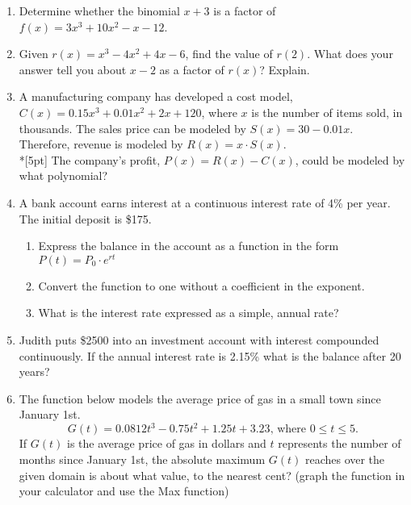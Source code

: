 \documentclass[12pt, oneside]{article}
\begin{document}
\begin{enumerate}

\item Determine whether the binomial $x+3$ is a factor of $f(x)=3x^3+10x^2-x-12$.

\item Given $r(x)=x^3-4x^2+4x-6$, find the value of $r(2)$.
What does your answer tell you about $x-2$ as a factor of $r(x)$? Explain. %

\item A manufacturing company has developed a cost model, $C(x)=0.15x^3+0.01x^2+2x+120$, where $x$ is the number of items sold, in thousands. The sales price can be modeled by $S(x)=30-0.01x$. Therefore, revenue is modeled by $R(x)=x \cdot S(x)$.\\*[5pt]
The company’s profit, $P(x)=R(x)-C(x)$, could be modeled by what polynomial?  %

\newpage

\item A bank account earns interest at a continuous interest rate of 4\% per year. The initial deposit is \$175.
\begin{enumerate}
    \item Express the balance in the account as a function in the form $P(t)=P_0 \cdot e^{rt}$\\[30pt]
    \item Convert the function to one without a coefficient in the exponent. \\[30pt]
    \item What is the interest rate expressed as a simple, annual rate?\\[30pt]
\end{enumerate}

\item Judith puts \$2500 into an investment account with interest compounded continuously. If the annual interest rate is 2.15\% what is the balance after 20 years?\\[80pt]

\item The function below models the average price of gas in a small town since January 1st.
\[G(t)=0.0812t^3 - 0.75t^2 +1.25t+3.23 \text{, where } 0 \leq t \leq 5.\]
If $G(t)$ is the average price of gas in dollars and $t$ represents the number of months since January 1st, the absolute maximum $G(t)$ reaches over the given domain is about what value, to the nearest cent? (graph the function in your calculator and use the Max function)%


\end{enumerate}
\end{document}
